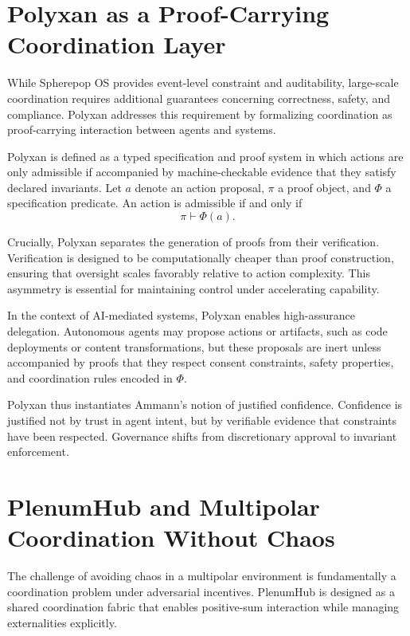 \documentclass[11pt,oneside]{article}
\begin{document}
\section{Polyxan as a Proof-Carrying Coordination Layer}

While Spherepop OS provides event-level constraint and auditability, large-scale coordination requires additional guarantees concerning correctness, safety, and compliance. Polyxan addresses this requirement by formalizing coordination as proof-carrying interaction between agents and systems.

Polyxan is defined as a typed specification and proof system in which actions are only admissible if accompanied by machine-checkable evidence that they satisfy declared invariants. Let \( a \) denote an action proposal, \( \pi \) a proof object, and \( \Phi \) a specification predicate. An action is admissible if and only if
\[
\pi \vdash \Phi(a).
\]

Crucially, Polyxan separates the generation of proofs from their verification. Verification is designed to be computationally cheaper than proof construction, ensuring that oversight scales favorably relative to action complexity. This asymmetry is essential for maintaining control under accelerating capability.

In the context of AI-mediated systems, Polyxan enables high-assurance delegation. Autonomous agents may propose actions or artifacts, such as code deployments or content transformations, but these proposals are inert unless accompanied by proofs that they respect consent constraints, safety properties, and coordination rules encoded in \( \Phi \).

Polyxan thus instantiates Ammann’s notion of justified confidence. Confidence is justified not by trust in agent intent, but by verifiable evidence that constraints have been respected. Governance shifts from discretionary approval to invariant enforcement.

\section{PlenumHub and Multipolar Coordination Without Chaos}

The challenge of avoiding chaos in a multipolar environment is fundamentally a coordination problem under adversarial incentives. PlenumHub is designed as a shared coordination fabric that enables positive-sum interaction while managing externalities explicitly.
\end{document}
